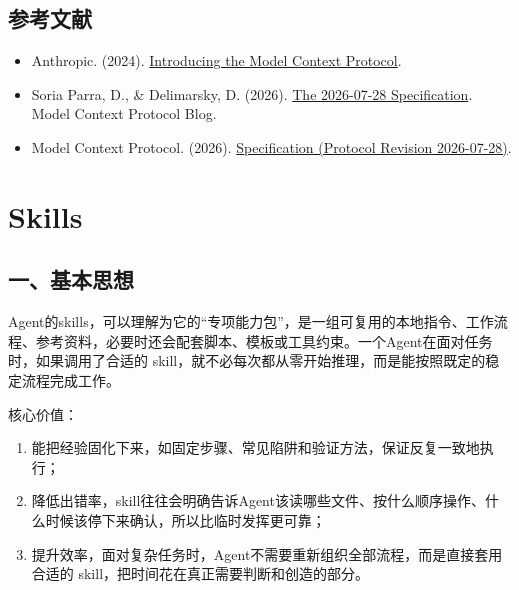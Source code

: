 \hypertarget{ux53c2ux8003ux6587ux732e-123}{%
\subsection{参考文献}\label{ux53c2ux8003ux6587ux732e-123}}

\vspace{0.25em}
\begin{itemize}
\tightlist
\item
  Anthropic. (2024). \href{https://www.anthropic.com/news/model-context-protocol}{Introducing the Model Context Protocol}.
\item
  Soria Parra, D., \& Delimarsky, D. (2026). \href{https://blog.modelcontextprotocol.io/posts/2026-07-28/}{The 2026-07-28 Specification}. Model Context Protocol Blog.
\item
  Model Context Protocol. (2026). \href{https://modelcontextprotocol.io/specification/2026-07-28}{Specification (Protocol Revision 2026-07-28)}.
\end{itemize}

\clearpage

\hypertarget{skills}{%
\section{Skills}\label{skills}}

\hypertarget{ux4e00ux57faux672cux601dux60f3-2}{%
\subsection{一、基本思想}\label{ux4e00ux57faux672cux601dux60f3-2}}

Agent的skills，可以理解为它的``专项能力包''，是一组可复用的本地指令、工作流程、参考资料，必要时还会配套脚本、模板或工具约束。一个Agent在面对任务时，如果调用了合适的 skill，就不必每次都从零开始推理，而是能按照既定的稳定流程完成工作。

核心价值：

\begin{enumerate}
\def\labelenumi{\arabic{enumi}.}
\item
  能把经验固化下来，如固定步骤、常见陷阱和验证方法，保证反复一致地执行；
\item
  降低出错率，skill往往会明确告诉Agent该读哪些文件、按什么顺序操作、什么时候该停下来确认，所以比临时发挥更可靠；
\item
  提升效率，面对复杂任务时，Agent不需要重新组织全部流程，而是直接套用合适的 skill，把时间花在真正需要判断和创造的部分。
\end{enumerate}

